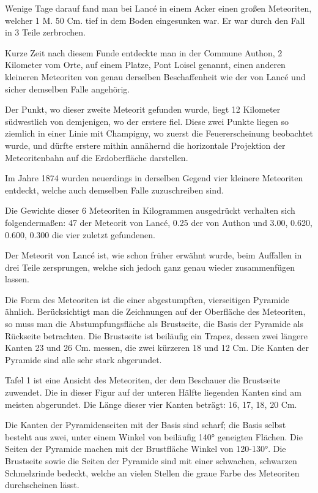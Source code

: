 \documentclass[a4paper, 11pt, oneside]{article}
\begin{document}
Wenige Tage darauf fand man bei Lancé in einem Acker einen großen Meteoriten, welcher 1 M. 50 Cm. tief in dem Boden eingesunken war. Er war durch den Fall in 3 Teile zerbrochen.

Kurze Zeit nach diesem Funde entdeckte man in der Commune Authon, 2 Kilometer vom Orte, auf einem Platze, Pont Loisel genannt, einen anderen kleineren Meteoriten von genau derselben Beschaffenheit wie der von Lancé und sicher demselben Falle angehörig.

Der Punkt, wo dieser zweite Meteorit gefunden wurde, liegt 12 Kilometer südwestlich von demjenigen, wo der erstere fiel. Diese zwei Punkte liegen so ziemlich in einer Linie mit Champigny, wo zuerst die Feuererscheinung beobachtet wurde, und dürfte erstere mithin annähernd die horizontale Projektion der Meteoritenbahn auf die Erdoberfläche darstellen.

Im Jahre 1874 wurden neuerdings in derselben Gegend vier kleinere Meteoriten entdeckt, welche auch demselben Falle zuzuschreiben sind.

Die Gewichte dieser 6 Meteoriten in Kilogrammen ausgedrückt verhalten sich folgendermaßen: 47 der Meteorit von Lancé, 0.25 der von Authon und 3.00, 0.620, 0.600, 0.300 die vier zuletzt gefundenen.

Der Meteorit von Lancé ist, wie schon früher erwähnt wurde, beim Auffallen in drei Teile zersprungen, welche sich jedoch ganz genau wieder zusammenfügen lassen.

Die Form des Meteoriten ist die einer abgestumpften, vierseitigen Pyramide ähnlich. Berücksichtigt man die Zeichnungen auf der Oberfläche des Meteoriten, so muss man die Abstumpfungsfläche als Brustseite, die Basis der Pyramide als Rückseite betrachten. Die Brustseite ist beiläufig ein Trapez, dessen zwei längere Kanten 23 und 26 Cm. messen, die zwei kürzeren 18 und 12 Cm. Die Kanten der Pyramide sind alle sehr stark abgerundet.

Tafel 1 ist eine Ansicht des Meteoriten, der dem Beschauer die Brustseite zuwendet. Die in dieser Figur auf der unteren Hälfte liegenden Kanten sind am meisten abgerundet. Die Länge dieser vier Kanten beträgt: 16, 17, 18, 20 Cm.

Die Kanten der Pyramidenseiten mit der Basis sind scharf; die Basis selbst besteht aus zwei, unter einem Winkel von beiläufig 140° geneigten Flächen. Die Seiten der Pyramide machen mit der Brustfläche Winkel von 120-130°. Die Brustseite sowie die Seiten der Pyramide sind mit einer schwachen, schwarzen Schmelzrinde bedeckt, welche an vielen Stellen die graue Farbe des Meteoriten durchscheinen lässt.
\end{document}
